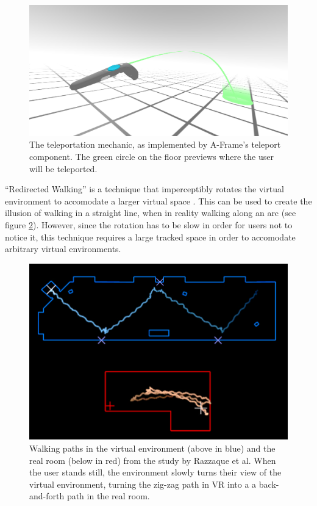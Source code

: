 \documentclass[nobib]{tufte-book} %
\begin{document}
\begin{figure}
  \includegraphics{teleport.png}
  \caption{The teleportation mechanic, as implemented by A-Frame's teleport component. The green circle on the floor previews where the user will be teleported.}
  \label{fig:teleport}
\end{figure}

\newpage

``Redirected Walking'' is a technique that imperceptibly rotates the virtual environment to accomodate a larger virtual space \cite{razzaque2001redirected}. This can be used to create the illusion of walking in a straight line, when in reality walking along an arc (see figure \ref{fig:redirected}). However, since the rotation has to be slow in order for users not to notice it, this technique requires a large tracked space in order to accomodate arbitrary virtual environments.

\begin{figure}
  \includegraphics{redirected.png}
  \caption{Walking paths in the virtual environment (above in blue) and the real room (below in red) from the study by Razzaque et al. When the user stands still, the environment slowly turns their view of the virtual environment, turning the zig-zag path in VR into a a back-and-forth path in the real room.}
  \label{fig:redirected}
\end{figure}
\end{document}
